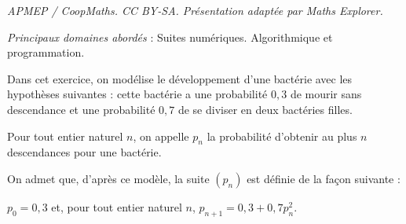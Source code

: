 \documentclass[10pt]{article}
\begin{document}
\noindent\textit{APMEP / CoopMaths. CC BY-SA. Présentation adaptée par Maths Explorer.}\par\medskip
\medskip

\emph{Principaux domaines abordés} : Suites numériques.
Algorithmique et programmation.

\bigskip



Dans cet exercice, on modélise le développement d'une bactérie avec les hypothèses suivantes : cette bactérie a une probabilité $0,3$ de mourir sans descendance et une probabilité $0,7$ de se diviser en deux bactéries filles.



Pour tout entier naturel $n$, on appelle $p_n$ la probabilité d'obtenir au plus $n$ descendances pour une bactérie. 

On admet que, d'après ce modèle, la suite $\left(p_n\right)$ est définie de la façon suivante :

$p_0 = 0,3$ et, pour tout entier naturel $n$, $p_{n+1} = 0,3 + 0,7p_n^2$.
\end{document}
